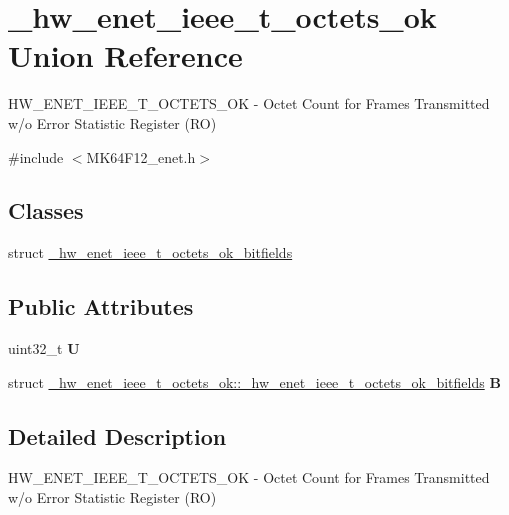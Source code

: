 \hypertarget{union__hw__enet__ieee__t__octets__ok}{}\section{\+\_\+hw\+\_\+enet\+\_\+ieee\+\_\+t\+\_\+octets\+\_\+ok Union Reference}
\label{union__hw__enet__ieee__t__octets__ok}


H\+W\+\_\+\+E\+N\+E\+T\+\_\+\+I\+E\+E\+E\+\_\+\+T\+\_\+\+O\+C\+T\+E\+T\+S\+\_\+\+OK -\/ Octet Count for Frames Transmitted w/o Error Statistic Register (RO)  




{\ttfamily \#include $<$M\+K64\+F12\+\_\+enet.\+h$>$}

\subsection*{Classes}
\begin{DoxyCompactItemize}
\item 
struct \hyperlink{struct__hw__enet__ieee__t__octets__ok_1_1__hw__enet__ieee__t__octets__ok__bitfields}{\+\_\+hw\+\_\+enet\+\_\+ieee\+\_\+t\+\_\+octets\+\_\+ok\+\_\+bitfields}
\end{DoxyCompactItemize}
\subsection*{Public Attributes}
\begin{DoxyCompactItemize}
\item 
uint32\+\_\+t {\bfseries U}\hypertarget{union__hw__enet__ieee__t__octets__ok_a946dfd36cd97e8dbbbd0bda1a8d97f42}{}\label{union__hw__enet__ieee__t__octets__ok_a946dfd36cd97e8dbbbd0bda1a8d97f42}

\item 
struct \hyperlink{struct__hw__enet__ieee__t__octets__ok_1_1__hw__enet__ieee__t__octets__ok__bitfields}{\+\_\+hw\+\_\+enet\+\_\+ieee\+\_\+t\+\_\+octets\+\_\+ok\+::\+\_\+hw\+\_\+enet\+\_\+ieee\+\_\+t\+\_\+octets\+\_\+ok\+\_\+bitfields} {\bfseries B}\hypertarget{union__hw__enet__ieee__t__octets__ok_aae54935358c601c63d5b76b5127031af}{}\label{union__hw__enet__ieee__t__octets__ok_aae54935358c601c63d5b76b5127031af}

\end{DoxyCompactItemize}


\subsection{Detailed Description}
H\+W\+\_\+\+E\+N\+E\+T\+\_\+\+I\+E\+E\+E\+\_\+\+T\+\_\+\+O\+C\+T\+E\+T\+S\+\_\+\+OK -\/ Octet Count for Frames Transmitted w/o Error Statistic Register (RO) 

